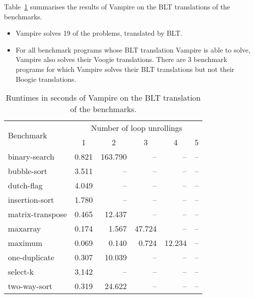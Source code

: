 Table~\ref{table:boogie/blt-results} summarises the results of Vampire on the BLT translations of the benchmarks.
\begin{itemize}
  \item Vampire solves 19 of the problems, translated by BLT.
  \item For all benchmark programs whose BLT translation Vampire is able to solve, Vampire also solves their Voogie translations. There are 3 benchmark programs for which Vampire solves their BLT translations but not their Boogie translations.
\end{itemize}

\begin{table}\center
  \caption{Runtimes in seconds of Vampire on the BLT translation of the benchmarks.}
  \label{table:boogie/blt-results}
  \begin{tabular}[ht]{lrrrrr}
\hline
\multirow{2}{*}{Benchmark} & \multicolumn{5}{c}{Number of loop unrollings} \\ %
& \multicolumn{1}{c}{1} & \multicolumn{1}{c}{2} & \multicolumn{1}{c}{3} & \multicolumn{1}{c}{4} & \multicolumn{1}{c}{5} \\
\hline
binary-search    & 0.821 & 163.790 &     -- &     -- & -- \\
bubble-sort      & 3.511 &      -- &     -- &     -- & -- \\
dutch-flag       & 4.049 &      -- &     -- &     -- & -- \\
insertion-sort   & 1.780 &      -- &     -- &     -- & -- \\
matrix-transpose & 0.465 &  12.437 &     -- &     -- & -- \\
maxarray         & 0.174 &   1.567 & 47.724 &     -- & -- \\
maximum          & 0.069 &   0.140 &  0.724 & 12.234 & -- \\
one-duplicate    & 0.307 &  10.039 &     -- &     -- & -- \\
select-k         & 3.142 &      -- &     -- &     -- & -- \\
two-way-sort     & 0.319 &  24.622 &     -- &     -- & -- \\
  \end{tabular}
\end{table}

